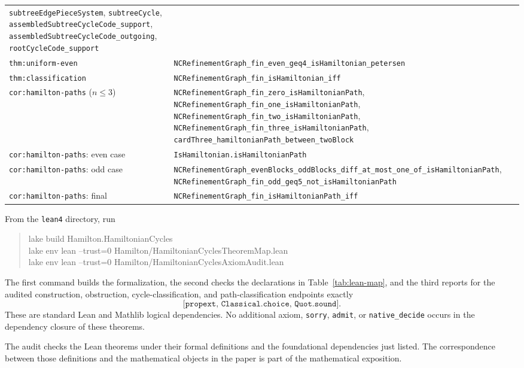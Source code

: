 \documentclass[12pt]{article}
\newcommand{\leanname}[1]{\nolinkurl{#1}}
\begin{document}
\begin{longtable}{p{}p{}}
\leanname{subtreeEdgePieceSystem}, \leanname{subtreeCycle},
\leanname{assembledSubtreeCycleCode_support},
\leanname{assembledSubtreeCycleCode_outgoing},
\leanname{rootCycleCode_support}\\
\leanname{thm:uniform-even} &
\leanname{NCRefinementGraph_fin_even_geq4_isHamiltonian_petersen}\\
\leanname{thm:classification} &
\leanname{NCRefinementGraph_fin_isHamiltonian_iff}\\
\leanname{cor:hamilton-paths} ($n\leq3$) &
\leanname{NCRefinementGraph_fin_zero_isHamiltonianPath},
\leanname{NCRefinementGraph_fin_one_isHamiltonianPath},
\leanname{NCRefinementGraph_fin_two_isHamiltonianPath},
\leanname{NCRefinementGraph_fin_three_isHamiltonianPath},
\leanname{cardThree_hamiltonianPath_between_twoBlock}\\
\leanname{cor:hamilton-paths}: even case &
\leanname{IsHamiltonian.isHamiltonianPath}\\
\leanname{cor:hamilton-paths}: odd case &
\leanname{NCRefinementGraph_evenBlocks_oddBlocks_diff_at_most_one_of_isHamiltonianPath},
\leanname{NCRefinementGraph_fin_odd_geq5_not_isHamiltonianPath}\\
\leanname{cor:hamilton-paths}: final &
\leanname{NCRefinementGraph_fin_isHamiltonianPath_iff}\\
\bottomrule
\end{longtable}
\endgroup

From the \texttt{lean4} directory, run
\begin{quote}\scriptsize\ttfamily
lake build Hamilton.HamiltonianCycles\\
lake env lean --trust=0 Hamilton/HamiltonianCyclesTheoremMap.lean\\
lake env lean --trust=0 Hamilton/HamiltonianCyclesAxiomAudit.lean
\end{quote}
The first command builds the formalization, the second checks the declarations
in Table~\ref{tab:lean-map}, and the third reports for the audited construction,
obstruction, cycle-classification, and path-classification endpoints exactly
\[
 \texttt{[propext, Classical.choice, Quot.sound]}.
\]
These are standard Lean and Mathlib logical dependencies.  No additional
axiom, \texttt{sorry}, \texttt{admit}, or \texttt{native\_decide} occurs in
the dependency closure of these theorems.

The audit checks the Lean theorems under their formal definitions and the
foundational dependencies just listed.  The correspondence between those
definitions and the mathematical objects in the paper is part of the
mathematical exposition.
\end{document}
